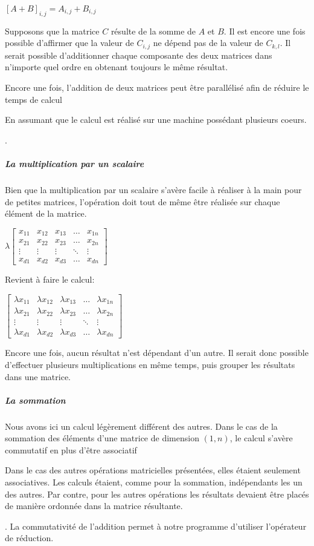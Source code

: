 \documentclass[letterpaper,10pt,french]{sphinxmanual}
\begin{document}
\([A+B]_{i,j} = A_{i,j} + B_{i,j}\)

Supposons que la matrice \(C\) résulte de la somme de \(A\) et \(B\). Il est encore une fois possible d’affirmer que la valeur de \(C_{i,j}\) ne dépend pas de la valeur de \(C_{k,l}\). Il serait possible d’additionner chaque composante des deux matrices dans n’importe quel ordre en obtenant toujours le même résultat.

Encore une fois, l’addition de deux matrices peut être parallélisé afin de réduire le temps de calcul%
\begin{footnote}[27]\sphinxAtStartFootnote
En assumant que le calcul est réalisé sur une machine possédant plusieurs coeurs.
%
\end{footnote}.


\subparagraph{La multiplication par un scalaire}
\label{\detokenize{preprocessing:la-multiplication-par-un-scalaire}}
Bien que la multiplication par un scalaire s’avère facile à réaliser à la main pour de petites matrices, l’opération doit tout de même être réalisée sur chaque élément de la matrice.

\( \lambda \begin{bmatrix}
    x_{11} & x_{12} & x_{13} & \dots  & x_{1n} \\
    x_{21} & x_{22} & x_{23} & \dots  & x_{2n} \\
    \vdots & \vdots & \vdots & \ddots & \vdots \\
    x_{d1} & x_{d2} & x_{d3} & \dots  & x_{dn}
\end{bmatrix} \)

Revient à faire le calcul:

\(\begin{bmatrix}
    \lambda x_{11} & \lambda x_{12} & \lambda x_{13} & \dots  & \lambda x_{1n} \\
    \lambda x_{21} & \lambda x_{22} & \lambda x_{23} & \dots  & \lambda x_{2n} \\
    \vdots & \vdots & \vdots & \ddots & \vdots \\
    \lambda x_{d1} & \lambda x_{d2} & \lambda x_{d3} & \dots  & \lambda x_{dn}
\end{bmatrix}\)

Encore une fois, aucun résultat n’est dépendant d’un autre. Il serait donc possible d’effectuer plusieurs multiplications en même temps, puis grouper les résultats dans une matrice.


\subparagraph{La sommation}
\label{\detokenize{preprocessing:la-sommation}}
Nous avons ici un calcul légèrement différent des autres. Dans le cas de la sommation des éléments d’une matrice de dimension \((1,n)\), le calcul s’avère commutatif en plus d’être associatif%
\begin{footnote}[28]\sphinxAtStartFootnote
Dans le cas des autres opérations matricielles présentées, elles étaient seulement associatives. Les calculs étaient, comme pour la sommation, indépendants les un des autres. Par contre, pour les autres opérations les résultats devaient être placés de manière ordonnée dans la matrice résultante.
%
\end{footnote}. La commutativité de l’addition permet à notre programme d’utiliser l’opérateur de réduction.
\end{document}
